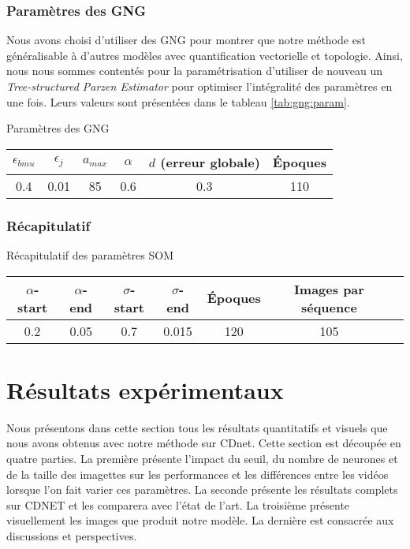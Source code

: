 	\subsubsection{Paramètres des GNG}

	Nous avons choisi d'utiliser des GNG pour montrer que notre méthode est généralisable à d'autres modèles avec quantification vectorielle et topologie. Ainsi, nous nous sommes contentés pour la paramétrisation d'utiliser de nouveau un \textit{Tree-structured Parzen Estimator} pour optimiser l'intégralité des paramètres en une fois. Leurs valeurs sont présentées dans le tableau \ref{tab:gng:param}.

	\begin{tableth}
	\caption[Paramètres GNG]{Paramètres des GNG}
	\begin{tabular}{|c|c|c|c|c|c|}
		\hline
		$\epsilon_{bmu}$ & $\epsilon_{j}$ & $a_{max}$ & $\alpha$ & $d$ (erreur globale) & Époques\\
		\hline
		0.4 & 0.01 & 85 & 0.6 & 0.3 & 110\\
		\hline
	\end{tabular}\label{tab:gng:param}
	\end{tableth}

	\subsubsection{Récapitulatif}\label{sec:param:recap}

	\begin{tableth}
	\caption[Récapitulatif des paramètres SOM]{Récapitulatif des paramètres SOM}
	\begin{tabular}{|cc|cc|c|c|c|}
		\hline
		$\alpha$-start	& $\alpha$-end & $\sigma$-start & $\sigma$-end & Époques & Images par séquence\\
		\hline
		0.2 & 0.05 & 0.7 & 0.015 & 120 & 105\\
		\hline
	\end{tabular}\label{tab:recap:param}
	\end{tableth}


	\newpage

	\section{Résultats expérimentaux}

	Nous présentons dans cette section tous les résultats quantitatifs et visuels que nous avons obtenus avec notre méthode sur CDnet. Cette section est découpée en quatre parties. La première présente l'impact du seuil, du nombre de neurones et de la taille des imagettes sur les performances et les différences entre les vidéos lorsque l'on fait varier ces paramètres. La seconde présente les résultats complets sur CDNET et les comparera avec l'état de l'art. La troisième présente visuellement les images que produit notre modèle. La dernière est consacrée aux discussions et perspectives.

